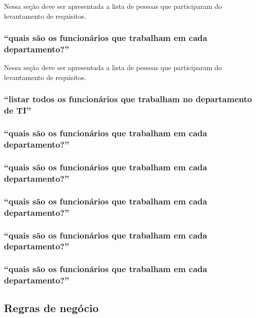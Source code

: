 \documentclass[11pt]{../../classes/ifscarticle}
\begin{document}
Nessa seção deve ser apresentada a lista de pessoas que participaram do levantamento de requisitos.


\subsubsection{“quais são os funcionários que trabalham em cada departamento?”}

Nessa seção deve ser apresentada a lista de pessoas que participaram do levantamento de requisitos.


\subsubsection{“listar todos os funcionários que trabalham no departamento de TI”}


\subsubsection{“quais são os funcionários que trabalham em cada departamento?”}


\subsubsection{“quais são os funcionários que trabalham em cada departamento?”}


\subsubsection{“quais são os funcionários que trabalham em cada departamento?”}


\subsubsection{“quais são os funcionários que trabalham em cada departamento?”}


\subsubsection{“quais são os funcionários que trabalham em cada departamento?”}


\subsection{Regras de negócio}
\label{sec:regrasdenegocio}
\end{document}
